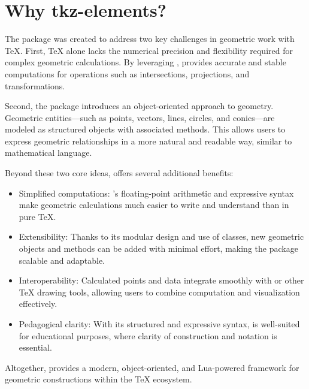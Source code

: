 \newpage
\section{Why tkz-elements?} %
\label{sec:why_tkz_elements}

The  package was created to address two key challenges in geometric work with TeX. First, TeX alone lacks the numerical precision and flexibility required for complex geometric calculations. By leveraging ,  provides accurate and stable computations for operations such as intersections, projections, and transformations.

Second, the package introduces an object-oriented approach to geometry. Geometric entities—such as points, vectors, lines, circles, and conics—are modeled as structured objects with associated methods. This allows users to express geometric relationships in a more natural and readable way, similar to mathematical language.

Beyond these two core ideas,  offers several additional benefits:

\begin{itemize}
 
 \item  Simplified computations: 's floating-point arithmetic and expressive syntax make geometric calculations much easier to write and understand than in pure TeX.

\item   Extensibility: Thanks to its modular design and use of classes, new geometric objects and methods can be added with minimal effort, making the package scalable and adaptable.

\item   Interoperability: Calculated points and data integrate smoothly with \TIKZ{} or other TeX drawing tools, allowing users to combine computation and visualization effectively.
 
 \item  Pedagogical clarity: With its structured and expressive syntax,  is well-suited for educational purposes, where clarity of construction and notation is essential.
\end{itemize}

Altogether,  provides a modern, object-oriented, and Lua-powered framework for geometric constructions within the TeX ecosystem.





